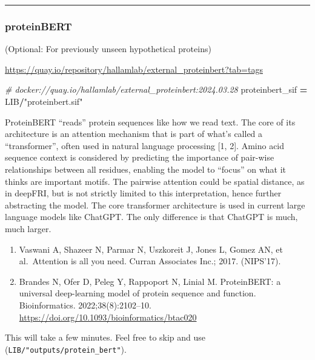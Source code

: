 \documentclass[
]{book}
\newenvironment{Shaded}{\begin{snugshade}}{\end{snugshade}}
\newcommand{\CommentTok}[1]{\textcolor[rgb]{0.56,0.35,0.01}{\textit{#1}}}
\newcommand{\NormalTok}[1]{#1}
\newcommand{\OperatorTok}[1]{\textcolor[rgb]{0.81,0.36,0.00}{\textbf{#1}}}
\newcommand{\StringTok}[1]{\textcolor[rgb]{0.31,0.60,0.02}{#1}}
\providecommand{\tightlist}{%
  \setlength{\itemsep}{0pt}\setlength{\parskip}{0pt}}
\begin{document}
\begin{center}\rule{0.5\linewidth}{0.5pt}\end{center}

\subsubsection{proteinBERT}\label{proteinbert}

(Optional: For previously unseen hypothetical proteins)

\url{https://quay.io/repository/hallamlab/external_proteinbert?tab=tags}

\begin{Shaded}
\begin{Highlighting}[numbers=left,,]
\CommentTok{\# docker://quay.io/hallamlab/external\_proteinbert:2024.03.28}
\NormalTok{proteinbert\_sif }\OperatorTok{=}\NormalTok{ LIB}\OperatorTok{/}\StringTok{"proteinbert.sif"}
\end{Highlighting}
\end{Shaded}

ProteinBERT ``reads'' protein sequences like how we read text. The core of its architecture is an attention mechanism that is
part of what's called a ``transformer'', often used in natural language processing {[}1, 2{]}. Amino acid sequence context is considered by
predicting the importance of pair-wise relationships between all residues, enabling the model to ``focus'' on what it thinks are important motifs.
The pairwise attention could be spatial distance, as in deepFRI, but is not strictly limited to this interpretation,
hence further abstracting the model. The core transformer architecture is used in current large language models like ChatGPT.
The only difference is that ChatGPT is much, much larger.

\begin{enumerate}
\def\labelenumi{\arabic{enumi}.}
\tightlist
\item
  Vaswani A, Shazeer N, Parmar N, Uszkoreit J, Jones L, Gomez AN, et al.~Attention is all you need. Curran Associates Inc.; 2017. (NIPS'17).
\item
  Brandes N, Ofer D, Peleg Y, Rappoport N, Linial M. ProteinBERT: a universal deep-learning model of protein sequence and function. Bioinformatics. 2022;38(8):2102--10. \url{https://doi.org/10.1093/bioinformatics/btac020}
\end{enumerate}

This will take a few minutes. Feel free to skip and use (\texttt{LIB/"outputs/protein\_bert"}).
\end{document}
